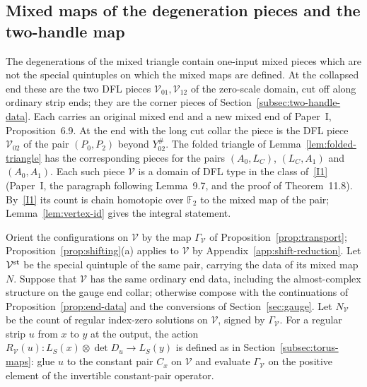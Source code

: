 \documentclass[11pt]{amsart}
\theoremstyle{definition}
\theoremstyle{remark}
\theoremstyle{plain}
\numberwithin{equation}{section}
\newcommand{\FF}{\mathbb F_2}
\begin{document}
\subsection{Mixed maps of the degeneration pieces and the two-handle map}\label{subsec:vertex-id}
The degenerations of the mixed triangle contain one-input mixed pieces
which are not the special quintuples on which the mixed maps are
defined. At the collapsed end these are the two DFL pieces
$\mathcal V_{01},\mathcal V_{12}$ of the zero-scale domain, cut off along
ordinary strip ends; they are the corner pieces of
Section~\ref{subsec:two-handle-data}. Each carries an original mixed
end and a new mixed end of Paper~I, Proposition~6.9. At the end with the
long cut collar the piece is the DFL piece $\mathcal V_{02}$ of the pair
$(P_0,P_2)$ beyond $Y_{02}^\#$. The folded triangle of
Lemma~\ref{lem:folded-triangle} has the corresponding pieces for the
pairs $(A_0,L_C)$, $(L_C,A_1)$ and $(A_0,A_1)$. Each such piece
$\mathcal V$ is a domain of DFL type in the class of~\ref{I1} (Paper~I,
the paragraph following Lemma~9.7, and the proof of Theorem~11.8). By~\ref{I1}
its count is chain homotopic over $\FF$ to the mixed map of the pair;
Lemma~\ref{lem:vertex-id} gives the integral statement.

Orient the configurations on $\mathcal V$ by the map $\Gamma_{\mathcal V}$
of Proposition~\ref{prop:transport}; Proposition~\ref{prop:shifting}(a)
applies to $\mathcal V$ by Appendix~\ref{app:shift-reduction}. Let
$\mathcal V^{\rm st}$ be the special quintuple of the same pair, carrying
the data of its mixed map $N$. Suppose that $\mathcal V$ has the same
ordinary end data, including the almost-complex structure on the gauge
end collar; otherwise compose with the continuations of
Proposition~\ref{prop:end-data} and the conversions of
Section~\ref{sec:gauge}. Let $N_{\mathcal V}$ be the count of regular
index-zero solutions on $\mathcal V$, signed by $\Gamma_{\mathcal V}$. For
a regular strip $u$ from $x$ to $y$ at the output, the action
$R_{\mathcal V}(u):L_S(x)\otimes\det D_u\to L_S(y)$ is defined as in
Section~\ref{subsec:torus-maps}: glue $u$ to the constant pair $C_x$ on
$\mathcal V$ and evaluate $\Gamma_{\mathcal V}$ on the positive element of
the invertible constant-pair operator.
\end{document}
